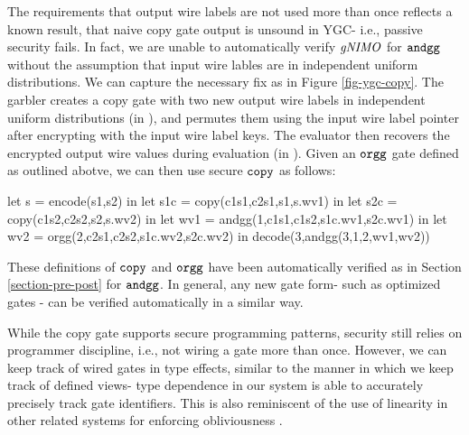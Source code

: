 The requirements that output wire labels are not used more than once
reflects a known result, that naive copy gate output is unsound in
YGC- i.e., passive security fails. In fact, we are unable to
automatically verify $\mathit{gNIMO}$ for $\texttt{andgg}$ without the assumption
that input wire lables are in independent uniform distributions. We
can capture the necessary fix as in Figure \ref{fig-ygc-copy}. The
garbler creates a copy gate with two new output wire labels in
independent uniform distributions (in ), and permutes
them using the input wire label pointer after encrypting with the
input wire label keys. The evaluator then recovers the encrypted
output wire values during evaluation (in ). Given an
$\texttt{orgg}$ gate defined as outlined abotve, we can then use
secure $\texttt{copy}$ as follows: 
\begin{verbatimtab}
  let s = encode(s1,s2) in
  let s1c = copy(c1s1,c2s1,s1,s.wv1) in
  let s2c = copy(c1s2,c2s2,s2,s.wv2) in
  let wv1 = andgg(1,c1s1,c1s2,s1c.wv1,s2c.wv1) in
  let wv2 = orgg(2,c2s1,c2s2,s1c.wv2,s2c.wv2) in
  decode(3,andgg(3,1,2,wv1,wv2))
\end{verbatimtab}
These definitions of $\texttt{copy}$ and $\texttt{orgg}$ have been
automatically verified as in Section \ref{section-pre-post} for
$\texttt{andgg}$. In general, any new gate form- such as optimized gates
\cite{XXX}- can be verified automatically in a similar way.

While the copy gate supports secure programming patterns, security
still relies on programmer discipline, i.e., not wiring a gate more
than once. However, we can keep track of wired gates in type effects,
similar to the manner in which we keep track of defined views- type
dependence in our system is able to accurately precisely track
gate identifiers. This is also reminiscent of the use of linearity
in other related systems for enforcing obliviousness \cite{darais2019language}. 
